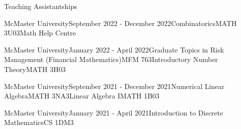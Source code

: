 \begin{rSection}{Teaching Assistantships}

\begin{taSubsectionFull}{McMaster University}{September 2022 - December 2022}{Combinatorics}{MATH 3U03}{Math Help Centre}{}
\end{taSubsectionFull}

\begin{taSubsectionFull}{McMaster University}{January 2022 - April 2022}{Graduate Topics in Risk Management (Financial Mathematics)}{MFM 763}{Introductory Number Theory}{MATH 3H03}
\end{taSubsectionFull}

\begin{taSubsectionFull}{McMaster University}{September 2021 - December 2021}{Numerical Linear Algebra}{MATH 3NA3}{Linear Algebra I}{MATH 1B03}
\end{taSubsectionFull}

\begin{taSubsectionMin}{McMaster University}{January 2021 - April 2021}{Introduction to Discrete Mathematics}{CS 1DM3}
\end{taSubsectionMin}

\end{rSection}